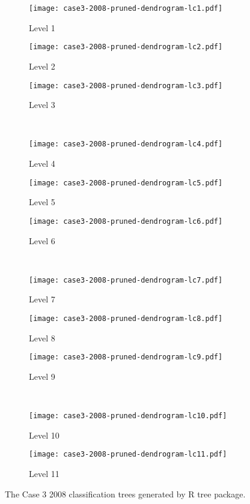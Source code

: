 \begin{appendices}
\begin{figure}[!ht] \centering
	\captionsetup[subfigure]{width=2.0in}
	\begin{subfigure}[t]{0.32\textwidth}
		\texttt{[image: case3-2008-pruned-dendrogram-lc1.pdf]}
		\caption{Level 1}
	\end{subfigure}
	\begin{subfigure}[t]{0.32\textwidth}
		\texttt{[image: case3-2008-pruned-dendrogram-lc2.pdf]}
		\caption{Level 2}
	\end{subfigure}
	\begin{subfigure}[t]{0.32\textwidth}
		\texttt{[image: case3-2008-pruned-dendrogram-lc3.pdf]}
		\caption{Level 3}
	\end{subfigure}\\
	\vspace{5pt}
	\begin{subfigure}[t]{0.32\textwidth}
		\texttt{[image: case3-2008-pruned-dendrogram-lc4.pdf]}
		\caption{Level 4}
	\end{subfigure}
	\begin{subfigure}[t]{0.32\textwidth}
		\texttt{[image: case3-2008-pruned-dendrogram-lc5.pdf]}
		\caption{Level 5}
	\end{subfigure}
	\begin{subfigure}[t]{0.32\textwidth}
		\texttt{[image: case3-2008-pruned-dendrogram-lc6.pdf]}
		\caption{Level 6}
	\end{subfigure}\\
	\vspace{5pt}	
	\begin{subfigure}[t]{0.32\textwidth}
		\texttt{[image: case3-2008-pruned-dendrogram-lc7.pdf]}
		\caption{Level 7}
	\end{subfigure}
	\begin{subfigure}[t]{0.32\textwidth}
		\texttt{[image: case3-2008-pruned-dendrogram-lc8.pdf]}
		\caption{Level 8}
	\end{subfigure}
	\begin{subfigure}[t]{0.32\textwidth}
		\texttt{[image: case3-2008-pruned-dendrogram-lc9.pdf]}
		\caption{Level 9}
	\end{subfigure}\\
	\vspace{5pt}
	\begin{subfigure}[t]{0.32\textwidth}
		\texttt{[image: case3-2008-pruned-dendrogram-lc10.pdf]}
		\caption{Level 10}
	\end{subfigure}
	\begin{subfigure}[t]{0.32\textwidth}
		\texttt{[image: case3-2008-pruned-dendrogram-lc11.pdf]}
		\caption{Level 11}
	\end{subfigure}
	\vspace{5pt}
	\caption[The Case 3 2008 classification trees generated by R tree package.]{The Case 3 2008 classification trees generated by R tree package.}
	\label{fig: appendix-fig.c19.tree}
\end{figure}


\end{appendices}
